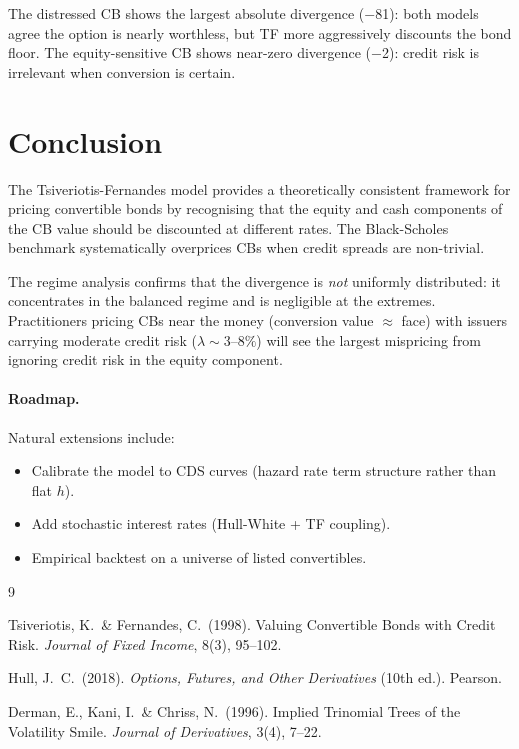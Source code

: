 \documentclass[11pt, a4paper]{article}
\begin{document}
The distressed CB shows the largest absolute divergence ($-$81): both
models agree the option is nearly worthless, but TF more aggressively
discounts the bond floor.  The equity-sensitive CB shows near-zero
divergence ($-$2): credit risk is irrelevant when conversion is certain.

\section{Conclusion}

The Tsiveriotis-Fernandes model provides a theoretically consistent
framework for pricing convertible bonds by recognising that the equity
and cash components of the CB value should be discounted at different
rates.  The Black-Scholes benchmark systematically overprices CBs when
credit spreads are non-trivial.

The regime analysis confirms that the divergence is \emph{not} uniformly
distributed: it concentrates in the balanced regime and is negligible
at the extremes.  Practitioners pricing CBs near the money (conversion
value $\approx$ face) with issuers carrying moderate credit risk
($\lambda \sim 3$--$8\%$) will see the largest mispricing from
ignoring credit risk in the equity component.

\paragraph{Roadmap.}
Natural extensions include:
\begin{itemize}
  \item Calibrate the model to CDS curves (hazard rate term structure rather than flat $h$).
  \item Add stochastic interest rates (Hull-White + TF coupling).
  \item Empirical backtest on a universe of listed convertibles.
\end{itemize}


\begin{thebibliography}{9}

Tsiveriotis, K.\ \& Fernandes, C.\ (1998).
\newblock Valuing Convertible Bonds with Credit Risk.
\newblock \emph{Journal of Fixed Income}, 8(3), 95--102.

Hull, J.\ C.\ (2018).
\newblock \emph{Options, Futures, and Other Derivatives} (10th ed.).
\newblock Pearson.

Derman, E., Kani, I.\ \& Chriss, N.\ (1996).
\newblock Implied Trinomial Trees of the Volatility Smile.
\newblock \emph{Journal of Derivatives}, 3(4), 7--22.

\end{thebibliography}
\end{document}
